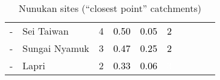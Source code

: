 \begin{table}[ht]
\begin{tabular}{C{0.05\textwidth}C{0.15\textwidth}C{0.08\textwidth}C{0.08\textwidth}C{0.08\textwidth}C{0.08\textwidth}C{0.08\textwidth}C{0.08\textwidth}C{0.08\textwidth}C{0.08\textwidth}}
  {-} & Sei Taiwan &   4 & \textcolor[HTML]{000000}{0.50} & \textcolor[HTML]{000000}{0.05} & \textcolor[HTML]{000000}{2} &  &  &  &  \\ 
  {-} & Sungai Nyamuk &   3 & \textcolor[HTML]{000000}{0.47} & \textcolor[HTML]{000000}{0.25} & \textcolor[HTML]{000000}{2} &  &  &  &  \\ 
  {-} & Lapri &   2 & \textcolor[HTML]{000000}{0.33} & \textcolor[HTML]{000000}{0.06} & \textcolor[HTML]{FFFFFF}{3} &  &  &  &  \\ 
  \end{tabular}
\endgroup
\caption{Nunukan sites (``closest point'' catchments)} 
\end{table}
